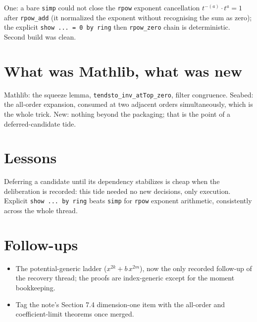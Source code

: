 \documentclass[11pt]{article}
\begin{document}
One: a bare \texttt{simp} could not close the \texttt{rpow} exponent
cancellation $t^{-(a)} \cdot t^{a} = 1$ after \texttt{rpow\_add}
(it normalized the exponent without recognising the sum as zero);
the explicit \texttt{show ... = 0 by ring} then \texttt{rpow\_zero}
chain is deterministic. Second build was clean.

\section{What was Mathlib, what was new}

Mathlib: the squeeze lemma, \texttt{tendsto\_inv\_atTop\_zero}, filter
congruence. Seabed: the all-order expansion, consumed at two adjacent
orders simultaneously, which is the whole trick. New: nothing beyond
the packaging; that is the point of a deferred-candidate tide.

\section{Lessons}

Deferring a candidate until its dependency stabilizes is cheap when the
deliberation is recorded: this tide needed no new decisions, only
execution. Explicit \texttt{show ... by ring} beats \texttt{simp} for
\texttt{rpow} exponent arithmetic, consistently across the whole
thread.

\section{Follow-ups}

\begin{itemize}
\item The potential-generic ladder ($x^{2k} + b\,x^{2m}$), now the only
recorded follow-up of the recovery thread; the proofs are
index-generic except for the moment bookkeeping.
\item Tag the note's Section 7.4 dimension-one item with the all-order
and coefficient-limit theorems once merged.
\end{itemize}
\end{document}
